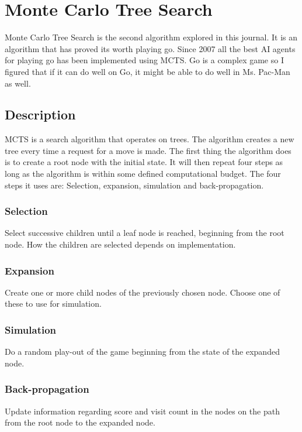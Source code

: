 
\section{Monte Carlo Tree Search}
Monte Carlo Tree Search is the second algorithm explored in this journal. It is an algorithm that has proved its worth playing go. Since 2007 all the best AI agents for playing go has been implemented using MCTS\cite[slide~5]{lecture:mcts}. Go is a complex game so I figured that if it can do well on Go, it might be able to do well in Ms. Pac-Man as well.

\subsection{Description}
MCTS is a search algorithm that operates on trees.
The algorithm creates a new tree every time a request for a move is made. The first thing the algorithm does is to create a root node with the initial state. It will then repeat four steps as long as the algorithm is within some defined computational budget. The four steps it uses are: Selection, expansion, simulation and back-propagation.

\subsubsection{Selection}
Select successive children until a leaf node is reached, beginning from the root node. How the children are selected depends on implementation.

\subsubsection{Expansion}
Create one or more child nodes of the previously chosen node. Choose one of these to use for simulation.

\subsubsection{Simulation}
Do a random play-out of the game beginning from the state of the expanded node.

\subsubsection{Back-propagation}
Update information regarding score and visit count in the nodes on the path from the root node to the expanded node.

